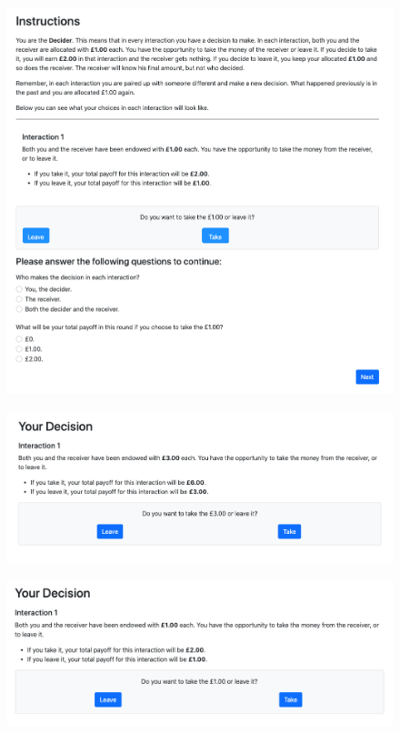 \documentclass[11pt]{article}
\theoremstyle{plainCl1}
\begin{document}
\begin{figure}[h]
\centering
\includegraphics[scale=0.5]{instructions}
\end{figure}

\begin{figure}[h]
\centering
\includegraphics[scale=0.5]{decision_high}
\end{figure}

\begin{figure}[h]
\centering
\includegraphics[scale=0.5]{decision_low}
\end{figure}
\end{document}
